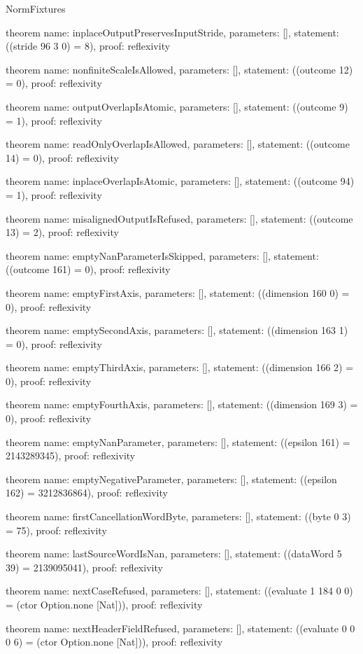 \begin{lexlean}{NormFixtures}
\begin{semanticmodule}
theorem{
  name: inplaceOutputPreservesInputStride,
  parameters: [],
  statement: ((stride 96 3 0) = 8),
  proof: reflexivity{}
}

theorem{
  name: nonfiniteScaleIsAllowed,
  parameters: [],
  statement: ((outcome 12) = 0),
  proof: reflexivity{}
}

theorem{
  name: outputOverlapIsAtomic,
  parameters: [],
  statement: ((outcome 9) = 1),
  proof: reflexivity{}
}

theorem{
  name: readOnlyOverlapIsAllowed,
  parameters: [],
  statement: ((outcome 14) = 0),
  proof: reflexivity{}
}

theorem{
  name: inplaceOverlapIsAtomic,
  parameters: [],
  statement: ((outcome 94) = 1),
  proof: reflexivity{}
}

theorem{
  name: misalignedOutputIsRefused,
  parameters: [],
  statement: ((outcome 13) = 2),
  proof: reflexivity{}
}

theorem{
  name: emptyNanParameterIsSkipped,
  parameters: [],
  statement: ((outcome 161) = 0),
  proof: reflexivity{}
}

theorem{
  name: emptyFirstAxis,
  parameters: [],
  statement: ((dimension 160 0) = 0),
  proof: reflexivity{}
}

theorem{
  name: emptySecondAxis,
  parameters: [],
  statement: ((dimension 163 1) = 0),
  proof: reflexivity{}
}

theorem{
  name: emptyThirdAxis,
  parameters: [],
  statement: ((dimension 166 2) = 0),
  proof: reflexivity{}
}

theorem{
  name: emptyFourthAxis,
  parameters: [],
  statement: ((dimension 169 3) = 0),
  proof: reflexivity{}
}

theorem{
  name: emptyNanParameter,
  parameters: [],
  statement: ((epsilon 161) = 2143289345),
  proof: reflexivity{}
}

theorem{
  name: emptyNegativeParameter,
  parameters: [],
  statement: ((epsilon 162) = 3212836864),
  proof: reflexivity{}
}

theorem{
  name: firstCancellationWordByte,
  parameters: [],
  statement: ((byte 0 3) = 75),
  proof: reflexivity{}
}

theorem{
  name: lastSourceWordIsNan,
  parameters: [],
  statement: ((dataWord 5 39) = 2139095041),
  proof: reflexivity{}
}

theorem{
  name: nextCaseRefused,
  parameters: [],
  statement: ((evaluate 1 184 0 0) = (ctor Option.none [Nat])),
  proof: reflexivity{}
}

theorem{
  name: nextHeaderFieldRefused,
  parameters: [],
  statement: ((evaluate 0 0 0 6) = (ctor Option.none [Nat])),
  proof: reflexivity{}
}


\end{semanticmodule}
\end{lexlean}
